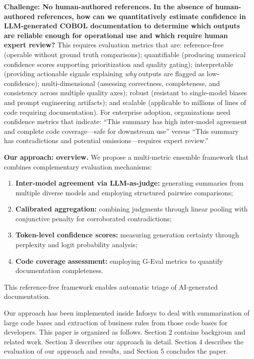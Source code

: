 \medskip
\noindent\textbf{Challenge: No human-authored references.} \textbf{In the absence of human-authored references, how can we quantitatively estimate confidence in LLM-generated COBOL documentation to determine which outputs are reliable enough for operational use and which require human expert review?} This requires evaluation metrics that are: reference-free (operable without ground truth comparisons); quantifiable (producing numerical confidence scores supporting prioritization and quality gating); interpretable (providing actionable signals explaining \textit{why} outputs are flagged as low-confidence); multi-dimensional (assessing correctness, completeness, and consistency across multiple quality axes); robust (resistant to single-model biases and prompt engineering artifacts); and scalable (applicable to millions of lines of code requiring documentation). For enterprise adoption, organizations need confidence metrics that indicate: ``This summary has high inter-model agreement and complete code coverage---safe for downstream use'' versus ``This summary has contradictions and potential omissions---requires expert review.''

\medskip
\noindent\textbf{Our approach: overview.} We propose a multi-metric ensemble framework that combines complementary evaluation mechanisms:
\begin{enumerate}
    \item \textbf{Inter-model agreement via LLM-as-judge:} generating summaries from multiple diverse models and employing structured pairwise comparisons;
    \item \textbf{Calibrated aggregation:} combining judgments through linear pooling with conjunctive penalty for corroborated contradictions;
    \item \textbf{Token-level confidence scores:} measuring generation certainty through perplexity and logit probability analysis;
    \item \textbf{Code coverage assessment:} employing G-Eval metrics to quantify documentation completeness.
\end{enumerate}
This reference-free framework enables automatic triage of AI-generated documentation.

Our approach has been implemented inside Infosys to deal with summarization of large code bases and extraction of business rules from those code bases for developers. This paper is organized as follows. Section 2 contains backgroun and related work. Section 3 describes our approach in detail. Section 4 describes the evaluation of our approach and results, and Section 5 concludes the paper.  